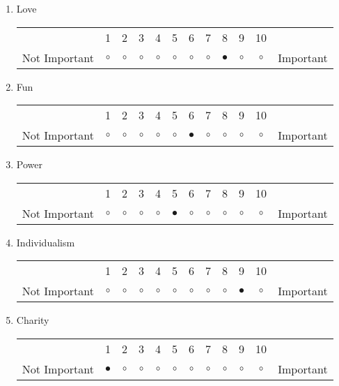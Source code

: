 \documentclass{article}
\begin{document}
\begin{enumerate}
\item Love\\
\vspace{5pt}
\begin{tabular}{c c c c c c c c c c c c}
     & 1 & 2 & 3 & 4 & 5 & 6 & 7 & 8 & 9 & 10 & \\
    Not Important & $\circ$ & $\circ$ & $\circ$ & $\circ$ & $\circ$ & $\circ$ & $\circ$ & $\bullet$ & $\circ$ & $\circ$ & Important \\ 
\end{tabular}

\item Fun\\
\vspace{5pt}
\begin{tabular}{c c c c c c c c c c c c}
     & 1 & 2 & 3 & 4 & 5 & 6 & 7 & 8 & 9 & 10 & \\
    Not Important & $\circ$ & $\circ$ & $\circ$ & $\circ$ & $\circ$ &  $\bullet$ & $\circ$ & $\circ$ & $\circ$ & $\circ$ & Important \\ 
\end{tabular}

\item Power\\
\vspace{5pt}
\begin{tabular}{c c c c c c c c c c c c}
     & 1 & 2 & 3 & 4 & 5 & 6 & 7 & 8 & 9 & 10 & \\
    Not Important & $\circ$ & $\circ$ & $\circ$ & $\circ$ & $\bullet$ & $\circ$ & $\circ$ & $\circ$ & $\circ$ & $\circ$ & Important \\ 
\end{tabular}

\item Individualism\\
\vspace{5pt}
\begin{tabular}{c c c c c c c c c c c c}
     & 1 & 2 & 3 & 4 & 5 & 6 & 7 & 8 & 9 & 10 & \\
    Not Important & $\circ$ & $\circ$ & $\circ$ & $\circ$ & $\circ$ & $\circ$ & $\circ$ & $\circ$ & $\bullet$ & $\circ$ & Important \\ 
\end{tabular}

\item Charity\\
\vspace{5pt}
\begin{tabular}{c c c c c c c c c c c c}
     & 1 & 2 & 3 & 4 & 5 & 6 & 7 & 8 & 9 & 10 & \\
    Not Important & $\bullet$ & $\circ$ & $\circ$ & $\circ$ & $\circ$ & $\circ$ & $\circ$ & $\circ$ & $\circ$ & $\circ$ & Important \\ 
\end{tabular}


\end{enumerate}
\end{document}
